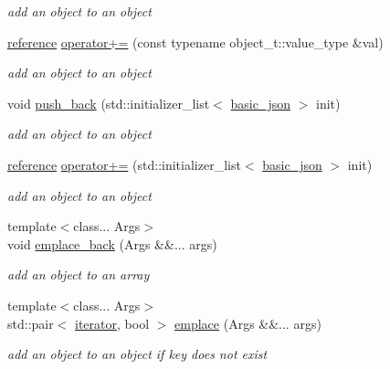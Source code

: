 \begin{DoxyCompactItemize}
\begin{DoxyCompactList}\small\item\em add an object to an object \end{DoxyCompactList}\item 
\mbox{\hyperlink{classnlohmann_1_1basic__json_ac6a5eddd156c776ac75ff54cfe54a5bc}{reference}} \mbox{\hyperlink{classnlohmann_1_1basic__json_abf04978d85a2d5c4754f4806d42f46fd}{operator+=}} (const typename object\+\_\+t\+::value\+\_\+type \&val)
\begin{DoxyCompactList}\small\item\em add an object to an object \end{DoxyCompactList}\item 
void \mbox{\hyperlink{classnlohmann_1_1basic__json_ab2716cbe2e997ab8309926b87f044434}{push\+\_\+back}} (std\+::initializer\+\_\+list$<$ \mbox{\hyperlink{classnlohmann_1_1basic__json}{basic\+\_\+json}} $>$ init)
\begin{DoxyCompactList}\small\item\em add an object to an object \end{DoxyCompactList}\item 
\mbox{\hyperlink{classnlohmann_1_1basic__json_ac6a5eddd156c776ac75ff54cfe54a5bc}{reference}} \mbox{\hyperlink{classnlohmann_1_1basic__json_a0cf23e7d44e78bb9014484971af2f40f}{operator+=}} (std\+::initializer\+\_\+list$<$ \mbox{\hyperlink{classnlohmann_1_1basic__json}{basic\+\_\+json}} $>$ init)
\begin{DoxyCompactList}\small\item\em add an object to an object \end{DoxyCompactList}\item 
{\footnotesize template$<$class... Args$>$ }\\void \mbox{\hyperlink{classnlohmann_1_1basic__json_aacf5eed15a8b66fb1e88910707a5e229}{emplace\+\_\+back}} (Args \&\&... args)
\begin{DoxyCompactList}\small\item\em add an object to an array \end{DoxyCompactList}\item 
{\footnotesize template$<$class... Args$>$ }\\std\+::pair$<$ \mbox{\hyperlink{classnlohmann_1_1basic__json_a099316232c76c034030a38faa6e34dca}{iterator}}, bool $>$ \mbox{\hyperlink{classnlohmann_1_1basic__json_a5338e282d1d02bed389d852dd670d98d}{emplace}} (Args \&\&... args)
\begin{DoxyCompactList}\small\item\em add an object to an object if key does not exist \end{DoxyCompactList}\item 

\end{DoxyCompactItemize}
